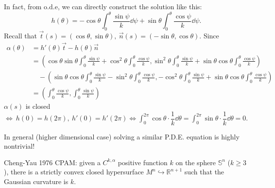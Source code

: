 In fact, from o.d.e, we can directly construct the solution like this:
\[
    h(\theta)=-\cos\theta \int_0^\theta \frac{\sin \psi}{k}\dd \psi
    +\sin\theta \int_0^\theta \frac{\cos \psi}{k}\dd \psi  
.\]
Recall that $\vec{t}(s)=(\cos\theta,\sin\theta),~\vec{n}(s)=(-\sin \theta,\cos\theta).$
Since
\begin{align*}
    \alpha(\theta)&=h'(\theta)\vec{t}-h(\theta)\vec{n}\\
    &=\left(
        \cos\theta\sin\theta\int_0^\theta\frac{\sin\psi}{k}
        +\cos^2\theta\int_0^\theta\frac{\cos\psi}{k},
        \sin^2\theta\int_0^\theta\frac{\sin\psi}{k}
        +\sin\theta\cos\theta\int_0^\theta\frac{\cos\psi}{k}
    \right)\\
    &\quad-\left( 
        \sin\theta\cos\theta\int_0^\theta\frac{\sin\psi}{k}
        -\sin^2\theta\int_0^\theta\frac{\cos\psi}{k},
        -\cos^2\theta\int_0^\theta\frac{\sin\psi}{k}
        +\sin\theta\cos\theta\int_0^\theta\frac{\cos\psi}{k}
    \right)\\
    &=\left(
        \int_0^\theta\frac{\cos\psi}{k},
        \int_0^\theta\frac{\sin\psi}{k}
    \right)
\end{align*}
$\alpha(s)$ is closed $\Leftrightarrow~h(0)=h(2\pi),~h'(0)=h'(2\pi)
\Leftrightarrow \int_0^{2\pi}\cos\theta\cdot\dfrac{1}{k}\dd \theta
=\int_0^{2\pi}\sin\theta\cdot\dfrac{1}{k}\dd \theta
=0$.
\begin{remark}
    In general (higher dimensional case) solving a similar P.D.E. equation is highly nontrivial!
    
    Cheng-Yau 1976 CPAM: given a $C^{k,\alpha}$ positive function $k$ on the
    sphere $\mathbb{S}^n$ ($k\ge 3$), there is a strictly convex closed 
    hypersurface $M^n \hookrightarrow \mathbb{R}^{n+1}$ such
    that the Gaussian curvature is $k$.
\end{remark} 
